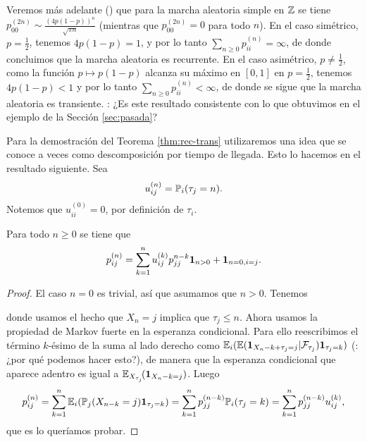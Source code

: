 \begin{ex}\label{ex:srw-rec-1}
Veremos más adelante (\ucmark) que para la marcha aleatoria simple en $\mathbb{Z}$ se tiene $p^{(2n)}_{00}\sim\frac{(4p(1-p))^n}{\sqrt{\pi n}}$ (mientras que $p^{(2n)}_{00}=0$ para todo $n$).
En el caso simétrico, $p=\frac12$, tenemos $4p(1-p)=1$, y por lo tanto $\sum_{n\geq0}p_{ii}^{(n)}=\infty$, de donde concluimos que la marcha aleatoria es recurrente.
En el caso asimétrico, $p\neq\frac12$, como la función $p\longmapsto p(1-p)$ alcanza su máximo en $[0,1]$ en $p=\frac12$, tenemos $4p(1-p)<1$ y por lo tanto $\sum_{n\geq0}p_{ii}^{(n)}<\infty$, de donde se sigue que la marcha aleatoria es transiente.
\uexer: ¿Es este resultado consistente con lo que obtuvimos en el ejemplo de la Sección \ref{sec:pasada}?
\end{ex}

Para la demostración del Teorema \ref{thm:rec-trans} utilizaremos una idea que se conoce a veces como descomposición por tiempo de llegada.
Esto lo hacemos en el resultado siguiente.
Sea
\begin{equation}
u^{(n)}_{ij}=\mathbb{P}_i(\tau_j=n).\label{eq:uijn}
\end{equation}
Notemos que $u^{(0)}_{ii}=0$, por definición de $\tau_i$.

\begin{lem}
Para todo $n\geq0$ se tiene que
\[p_{ij}^{(n)}=\sum_{k=1}^nu_{ij}^{(k)}p_{jj}^{n-k}\mathbf{1}_{n>0}+\mathbf{1}_{n=0,i=j}.\]
\end{lem}

\begin{proof}
El caso $n=0$ es trivial, así que asumamos que $n>0$.
Tenemos

donde usamos el hecho que $X_n=j$ implica que $\tau_j\leq n$.
Ahora usamos la propiedad de Markov fuerte en la esperanza condicional.
Para ello reescribimos el término $k$-ésimo de la suma al lado derecho como $\mathbb{E}_i(\mathbb{E}(\mathbf{1}_{X_n-k+\tau_j=j}|\mathcal{F}_{\tau_j})\mathbf{1}_{\tau_j=k})$ (\uexers: ¿por qué podemos hacer esto?), de manera que la esperanza condicional que aparece adentro es igual a $\mathbb{E}_{X_{\tau_j}}\!(\mathbf{1}_{X_n-k=j})$.
Luego
\[p_{ij}^{(n)}=\sum_{k=1}^n\mathbb{E}_i(\mathbb{P}_j(X_{n-k}=j)\mathbf{1}_{\tau_j=k})=\sum_{k=1}^np^{(n-k)}_{jj}\mathbb{P}_i(\tau_j=k)=\sum_{k=1}^np^{(n-k)}_{jj}u_{ij}^{(k)},\]
que es lo queríamos probar.
\end{proof}

